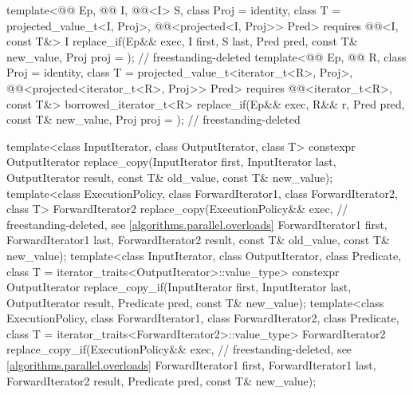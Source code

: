 \begin{codeblock}
{{    template<@@ Ep, @@ I, @@<I> S,
             class Proj = identity, class T = projected_value_t<I, Proj>,
             @@<projected<I, Proj>> Pred>
      requires @@<I, const T&>
      I replace_if(Ep&& exec, I first, S last, Pred pred,
                   const T& new_value, Proj proj = {});         // freestanding-deleted
    template<@@ Ep, @@ R, class Proj = identity,
             class T = projected_value_t<iterator_t<R>, Proj>,
             @@<projected<iterator_t<R>, Proj>> Pred>
      requires @@<iterator_t<R>, const T&>
      borrowed_iterator_t<R>
        replace_if(Ep&& exec, R&& r, Pred pred, const T& new_value,
                   Proj proj = {});                             // freestanding-deleted
  }

  template<class InputIterator, class OutputIterator, class T>
    constexpr OutputIterator replace_copy(InputIterator first, InputIterator last,
                                          OutputIterator result,
                                          const T& old_value, const T& new_value);
  template<class ExecutionPolicy, class ForwardIterator1, class ForwardIterator2, class T>
    ForwardIterator2 replace_copy(ExecutionPolicy&& exec,       // freestanding-deleted, see \ref{algorithms.parallel.overloads}
                                  ForwardIterator1 first, ForwardIterator1 last,
                                  ForwardIterator2 result,
                                  const T& old_value, const T& new_value);
  template<class InputIterator, class OutputIterator, class Predicate,
           class T = iterator_traits<OutputIterator>::value_type>
    constexpr OutputIterator replace_copy_if(InputIterator first, InputIterator last,
                                             OutputIterator result,
                                             Predicate pred, const T& new_value);
  template<class ExecutionPolicy, class ForwardIterator1, class ForwardIterator2,
           class Predicate, class T = iterator_traits<ForwardIterator2>::value_type>
    ForwardIterator2 replace_copy_if(ExecutionPolicy&& exec,    // freestanding-deleted, see \ref{algorithms.parallel.overloads}
                                     ForwardIterator1 first, ForwardIterator1 last,
                                     ForwardIterator2 result,
                                     Predicate pred, const T& new_value);

}
\end{codeblock}
